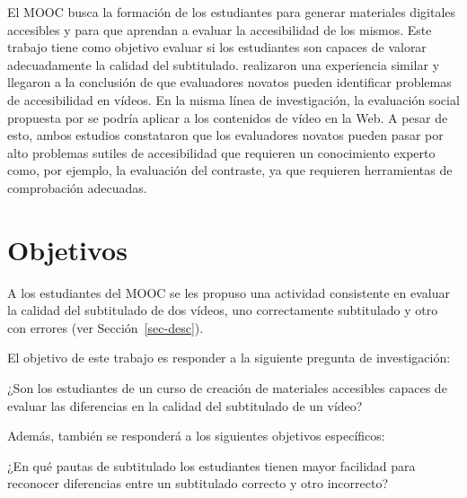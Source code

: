 \documentclass[
  12pt,
  a4paper,
  extrafontsizes,
  onecolumn,
  openright,
  table]{memoir}
\begin{document}
El MOOC busca la formación de los estudiantes para generar materiales
digitales accesibles y para que aprendan a evaluar la accesibilidad de
los mismos. Este trabajo tiene como objetivo evaluar si los estudiantes
son capaces de valorar adecuadamente la calidad del subtitulado.
\textcite{jperez2} realizaron una experiencia similar y llegaron a la
conclusión de que evaluadores novatos pueden identificar problemas de
accesibilidad en vídeos. En la misma línea de investigación, la
evaluación social propuesta por \textcite{kawanaka2008} se podría
aplicar a los contenidos de vídeo en la Web. A pesar de esto, ambos
estudios constataron que los evaluadores novatos pueden pasar por alto
problemas sutiles de accesibilidad que requieren un conocimiento experto
como, por ejemplo, la evaluación del contraste, ya que requieren
herramientas de comprobación adecuadas.

\hypertarget{sec-objetivos}{%
\section{Objetivos}\label{sec-objetivos}}

A los estudiantes del MOOC se les propuso una actividad consistente en
evaluar la calidad del subtitulado de dos vídeos, uno correctamente
subtitulado y otro con errores (ver Sección~\ref{sec-desc}).

El objetivo de este trabajo es responder a la siguiente pregunta de
investigación:

\begin{tcolorbox}[enhanced jigsaw, rightrule=.15mm, colback=white, toptitle=1mm, colbacktitle=quarto-callout-note-color!10!white, toprule=.15mm, titlerule=0mm, bottomtitle=1mm, opacitybacktitle=0.6, colframe=quarto-callout-note-color-frame, coltitle=black, leftrule=.75mm, bottomrule=.15mm, title=\textcolor{quarto-callout-note-color}{\faInfo}\hspace{0.5em}{Pregunta de investigación}, arc=.35mm, breakable, opacityback=0, left=2mm]

¿Son los estudiantes de un curso de creación de materiales accesibles
capaces de evaluar las diferencias en la calidad del subtitulado de un
vídeo?

\end{tcolorbox}

Además, también se responderá a los siguientes objetivos específicos:

\begin{tcolorbox}[enhanced jigsaw, rightrule=.15mm, colback=white, toptitle=1mm, colbacktitle=quarto-callout-tip-color!10!white, toprule=.15mm, titlerule=0mm, bottomtitle=1mm, opacitybacktitle=0.6, colframe=quarto-callout-tip-color-frame, coltitle=black, leftrule=.75mm, bottomrule=.15mm, title=\textcolor{quarto-callout-tip-color}{\faLightbulb}\hspace{0.5em}{Objetivo específico}, arc=.35mm, breakable, opacityback=0, left=2mm]

¿En qué pautas de subtitulado los estudiantes tienen mayor facilidad
para reconocer diferencias entre un subtitulado correcto y otro
incorrecto?

\end{tcolorbox}
\end{document}
